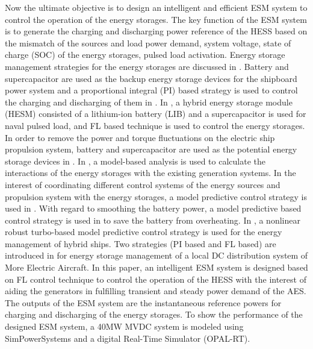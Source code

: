 Now the ultimate objective is to design an intelligent and efficient ESM system to control the operation of the energy storages. The key function of the ESM system is to generate the charging and discharging power reference of the HESS based on the mismatch of the sources and load power demand, system voltage, state of charge (SOC) of the energy storages, pulsed load activation. Energy storage management strategies for the energy storages are discussed in \cite{li2014real, cohen2016fuzzy, hou2015interaction, hou2016integrated, haseltalab2016multi}. Battery and supercapacitor are used as the backup energy storage devices for the shipboard power system and a proportional integral (PI) based strategy is used to control the charging and discharging of them in \cite{li2014real}. In \cite{cohen2016fuzzy}, a hybrid energy storage module (HESM) consisted of a lithium-ion battery (LIB) and a supercapacitor is used for naval pulsed load, and FL based technique is used to control the energy storages. In order to remove   the power and torque fluctuations on the electric ship propulsion system, battery and supercapacitor are used as the potential energy storage devices in \cite{hou2015interaction}. In \cite{hou2015interaction}, a model-based analysis is used to calculate the interactions of the energy storages with the existing generation systems. In the interest of coordinating different control systems of the energy sources and propulsion system with the energy storages, a model predictive control strategy is used in \cite{hou2016integrated}. With regard to smoothing the battery power, a model predictive based control strategy is used in \cite{bo2016battery} to save the battery from overheating. In \cite{haseltalab2016multi}, a nonlinear robust turbo-based model predictive control strategy is used for the energy management of hybrid ships. Two strategies (PI based and FL based) are introduced in \cite{zhang2010experimental} for energy storage management of a local DC distribution system of More Electric Aircraft. In this paper, an intelligent ESM system is designed based on FL control technique to control the operation of the HESS with the interest of aiding the generators in fulfilling transient and steady power demand of the AES. The outputs of the ESM system are the instantaneous reference powers for charging and discharging of the energy storages. To show the performance of the designed ESM system, a 40MW MVDC system is modeled using SimPowerSystems and a digital Real-Time Simulator (OPAL-RT). 


